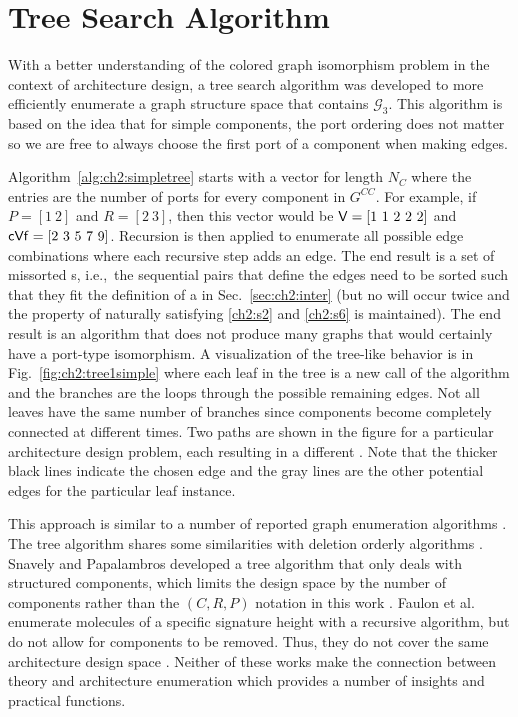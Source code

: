 \section{Tree Search Algorithm\label{sec:ch2:treesearch}}

With a better understanding of the colored graph isomorphism problem in the context of architecture design, a tree search algorithm was developed to more efficiently enumerate a graph structure space that contains $\mathcal{G}_3$. This algorithm is based on the idea that for simple components, the port ordering does not matter so we are free to always choose the first port of a component when making edges.
 
Algorithm~\ref{alg:ch2:simpletree} starts with a vector for length $N_C$ where the entries are the number of ports for every component in $G^{CC}$. For example, if $P = [1\ 2]$ and $R=[2\ 3]$, then this vector would be $\xvar{V} = [1\ 1\ 2\ 2\ 2]$ and $\xvar{cVf} = [2\ 3\ 5\ 7\ 9]$. Recursion is then applied to enumerate all possible edge combinations where each recursive step adds an edge. The end result is a set of missorted \mypm{}s, i.e.,~the sequential pairs that define the edges need to be sorted such that they fit the definition of a \mypm{} in Sec.~\ref{sec:ch2:inter} (but no \mypm{} will occur twice and the property of naturally satisfying \ref{ch2:s2} and \ref{ch2:s6} is maintained). The end result is an algorithm that does not produce many \mypm{} graphs that would certainly have a port-type isomorphism. A visualization of the tree-like behavior is in Fig.~\ref{fig:ch2:tree1simple} where each leaf in the tree is a new call of the algorithm and the branches are the loops through the possible remaining edges. Not all leaves have the same number of branches since components become completely connected at different times. Two paths are shown in the figure for a particular architecture design problem, each resulting in a different \mypm{}. Note that the thicker black lines indicate the chosen edge and the gray lines are the other potential edges for the particular leaf instance.



This approach is similar to a number of reported graph enumeration algorithms \cite{Carhart1975a, Colbourn1979a, Snavely1993a, Faulon2003b}.
The tree algorithm shares some similarities with deletion orderly algorithms \cite{Colbourn1979a}.
Snavely and Papalambros developed a tree algorithm that only deals with structured components, which limits the design space by the number of components rather than the $(C,R,P)$ notation in this work \cite{Snavely1993a}. 
Faulon et al. enumerate molecules of a specific signature height with a recursive algorithm, but do not allow for components to be removed. Thus, they do not cover the same architecture design space \cite{Faulon2003b}. 
Neither of these works make the connection between \mypm{} theory and architecture enumeration which provides a number of insights and practical functions. 

